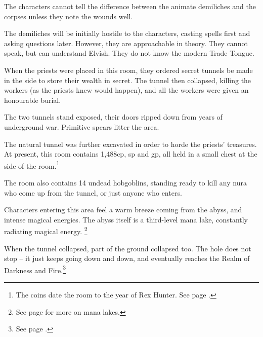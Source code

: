 \begin{multicols}{2}
\begin{exampletext}
\end{exampletext}


The characters cannot tell the difference between the animate demiliches and the corpses unless they note the wounds well.

The demiliches will be initially hostile to the characters, casting spells first and asking questions later.
However, they are approachable in theory.
They cannot speak, but can understand Elvish.
They do not know the modern Trade Tongue.


\begin{exampletext}

When the priests were placed in this room, they ordered secret tunnels be made in the side to store their wealth in secret.
The tunnel then collapsed, killing the workers (as the priests knew would happen), and all the workers were given an honourable burial.

\end{exampletext}

The two tunnels stand exposed, their doors ripped down from years of underground war.  Primitive spears litter the area.


The natural tunnel was further excavated in order to horde the priests' treasures.
At present, this room contains 1,488cp, \thepage sp and  gp, all held in a small chest at the side of the room.\footnote{The coins date the room to the year of Rex Hunter.
See page \pageref{r_hunter}.}

The room also contains 14 undead hobgoblins, standing ready to kill any nura who come up from the tunnel, or just anyone who enters.



Characters entering this area feel a warm breeze coming from the abyss, and intense magical energies.
The abyss itself is a third-level mana lake, constantly radiating magical energy.%
\footnote{See page \pageref{mana_lake} for more on mana lakes.}

\begin{exampletext}

When the tunnel collapsed, part of the ground collapsed too.  The hole does not stop -- it just keeps going down and down, and eventually reaches the Realm of Darkness and Fire.\footnote{See page \pageref{darknessandfire}.}


\end{exampletext}
\end{multicols}

